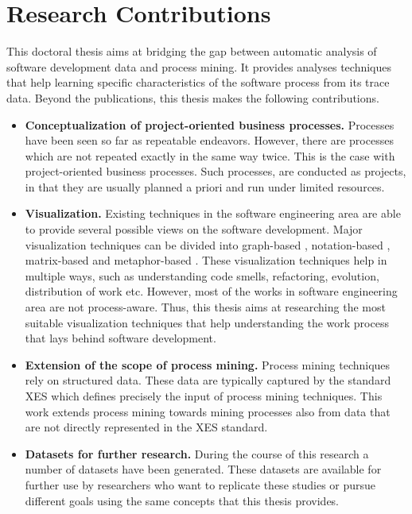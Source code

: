 \section{Research Contributions}
\label{sec:intro-contributions}


This doctoral thesis aims at bridging the gap between automatic analysis of software development data and process mining. It provides analyses techniques that help learning specific characteristics of the software process from its trace data. Beyond the publications, this thesis makes the following contributions.

\begin{itemize}
	
	\item \textbf{Conceptualization of project-oriented business processes.} Processes have been seen so far as repeatable endeavors. However, there are processes which are not repeated exactly in the same way twice. This is the case with project-oriented business processes. Such processes, are conducted as projects, in that they are usually planned a priori and run under limited resources. 
	
	\item \textbf{Visualization.} Existing techniques in the software engineering area are able to provide several possible views on the software development. Major visualization techniques can be divided into graph-based \citep{DBLP:journals/ijseke/GermanH06,DBLP:journals/smr/GreevyDG06}, notation-based \citep{DBLP:conf/wcre/McNairGW07}, matrix-based \citep{DBLP:conf/icsm/GirbaDL04} and metaphor-based \citep{DBLP:conf/vissoft/WettelL07}. These visualization techniques help in multiple ways, such as understanding code smells, refactoring, evolution, distribution of work etc. However, most of the works in software engineering area are not process-aware. Thus, this thesis aims at researching the most suitable visualization techniques that help understanding the work process that lays behind software development. 	

	\item \textbf{Extension of the scope of process mining.} Process mining techniques rely on structured data. These data are typically captured by the standard XES \citep{xes-standard:2015} which defines precisely the input of process mining techniques. This work extends process mining towards mining processes also from data that are not directly represented in the XES standard. 
	
	\item \textbf{Datasets for further research.} During the course of this research a number of datasets have been generated. These datasets are available for further use by researchers who want to replicate these studies or pursue different goals using the same concepts that this thesis provides. 
	
\end{itemize}



